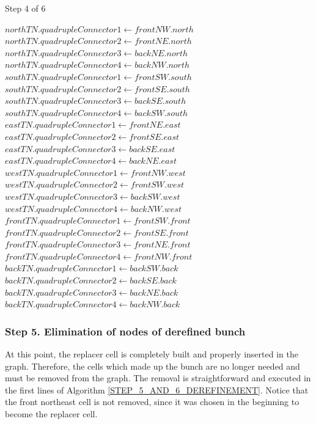 \begin{algorithm}[!ht]
    \caption{Step 4 of 6}
    \small{
    \begin{algorithmic}[1]
        \State $northTN.quadrupleConnector1 \gets frontNW.north $
        \State $northTN.quadrupleConnector2 \gets frontNE.north $
        \State $northTN.quadrupleConnector3 \gets backNE.north $
        \State $northTN.quadrupleConnector4 \gets backNW.north $
        \State
        \State $southTN.quadrupleConnector1 \gets frontSW.south $
        \State $southTN.quadrupleConnector2 \gets frontSE.south $
        \State $southTN.quadrupleConnector3 \gets backSE.south $
        \State $southTN.quadrupleConnector4 \gets backSW.south $
        \State
        \State $eastTN.quadrupleConnector1 \gets frontNE.east $
        \State $eastTN.quadrupleConnector2 \gets frontSE.east $
        \State $eastTN.quadrupleConnector3 \gets backSE.east $
        \State $eastTN.quadrupleConnector4 \gets backNE.east $
        \State
        \State $westTN.quadrupleConnector1 \gets frontNW.west $
        \State $westTN.quadrupleConnector2 \gets frontSW.west $
        \State $westTN.quadrupleConnector3 \gets backSW.west $
        \State $westTN.quadrupleConnector4 \gets backNW.west $
        \State
        \State $frontTN.quadrupleConnector1 \gets frontSW.front $
        \State $frontTN.quadrupleConnector2 \gets frontSE.front $
        \State $frontTN.quadrupleConnector3 \gets frontNE.front $
        \State $frontTN.quadrupleConnector4 \gets frontNW.front $
        \State
        \State $backTN.quadrupleConnector1 \gets backSW.back $
        \State $backTN.quadrupleConnector2 \gets backSE.back $
        \State $backTN.quadrupleConnector3 \gets backNE.back $
        \State $backTN.quadrupleConnector4 \gets backNW.back $
    \end{algorithmic}
    }
    \label{STEP_4_DEREFINEMENT}
\end{algorithm}

\subsubsection*{Step 5. Elimination of nodes of derefined bunch}
At this point, the replacer cell is completely built and properly
inserted in the graph. Therefore, the cells which made up the bunch
are no longer needed and must be removed from the graph. The removal
is straightforward and executed in the first lines of Algorithm
\ref{STEP_5_AND_6_DEREFINEMENT}. Notice that the front northeast
cell is not removed, since it was chosen in the beginning to become
the replacer cell.

